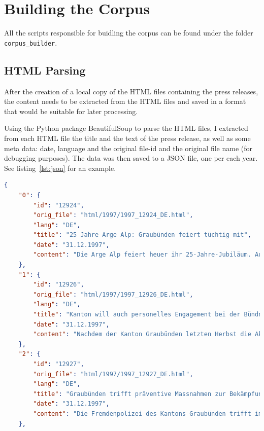 \section{Building the Corpus}
All the scripts responsible for buidling the corpus can be found under the folder \texttt{corpus\_builder}.

\subsection{HTML Parsing}
After the creation of a local copy of the HTML files containing the press releases, the content needs to be extracted from the HTML files and saved in a format that would be suitable for later processing.

Using the Python package BeautifulSoup to parse the HTML files, I extracted from each HTML file the title and the text of the press release, as well as some meta data: date, language and the original file-id and the original file name (for debugging purposes).  
The data was then saved to a JSON file, one per each year.
See listing~\ref{lst:json} for an example.


\begin{lstlisting}[caption={Example for a JSON file}, captionpos=b, label=lst:json, language=json]
{
    "0": {
        "id": "12924",
        "orig_file": "html/1997/1997_12924_DE.html",
        "lang": "DE",
        "title": "25 Jahre Arge Alp: Graubünden feiert tüchtig mit",
        "date": "31.12.1997",
        "content": "Die Arge Alp feiert heuer ihr 25-Jahre-Jubiläum. Aus diesem Grund finden vom 27. September bis 12. Oktober 1997 die Festwochen des Alpenraums in Telfs-Mösern, Tirol, statt. ..."
    },
    "1": {
        "id": "12926",
        "orig_file": "html/1997/1997_12926_DE.html",
        "lang": "DE",
        "title": "Kanton will auch personelles Engagement bei der Bündner Kraftwerke AG verstärken",
        "date": "31.12.1997",
        "content": "Nachdem der Kanton Graubünden letzten Herbst die Aktienmehrheit der Bündner Kraftwerke AG übernommen hat, will er nun auch seine Vertretung im Verwaltungsrat stärken...."
    },
    "2": {
        "id": "12927",
        "orig_file": "html/1997/1997_12927_DE.html",
        "lang": "DE",
        "title": "Graubünden trifft präventive Massnahmen zur Bekämpfung der illegalen Einwanderung",
        "date": "31.12.1997",
        "content": "Die Fremdenpolizei des Kantons Graubünden trifft im Einvernehmen mit dem kantonalen Sozialamt, dem Amt für Zivilschutz sowie der Kantonspolizei Graubünden Massnahmen, um die illegale Einwanderung in den Südtälern des Kantons Graubünden zu bekämpfen...."
    },
\end{lstlisting}

